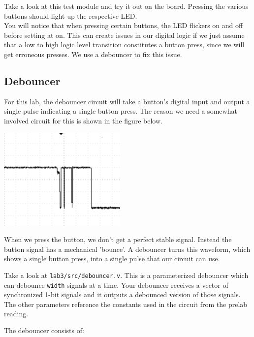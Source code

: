 \documentclass[11pt]{article}
\begin{document}
Take a look at this test module and try it out on the board. Pressing the various buttons should light up the respective LED. \\

You will notice that when pressing certain buttons, the LED flickers on and off before setting at on. This can create issues in our digital logic if we just assume that a low to high logic level transition constitutes a button press, since we will get erroneous presses. We use a debouncer to fix this issue.

\subsection{Debouncer}

For this lab, the debouncer circuit will take a button's digital input and output a single pulse indicating a single button press. The reason we need a somewhat involved circuit for this is shown in the figure below.

\begin{center}
\includegraphics[height=5cm]{images/lab2_fig4.png}
\end{center}

When we press the button, we don't get a perfect stable signal. Instead the button signal has a mechanical 'bounce'. A debouncer turns this waveform, which shows a single button press, into a single pulse that our circuit can use.

Take a look at \verb|lab3/src/debouncer.v|. This is a parameterized debouncer which can debounce \verb|width| signals at a time. Your debouncer receives a vector of synchronized 1-bit signals and it outputs a debounced version of those signals. The other parameters reference the constants used in the circuit from the prelab reading.

The debouncer consists of:
\end{document}
